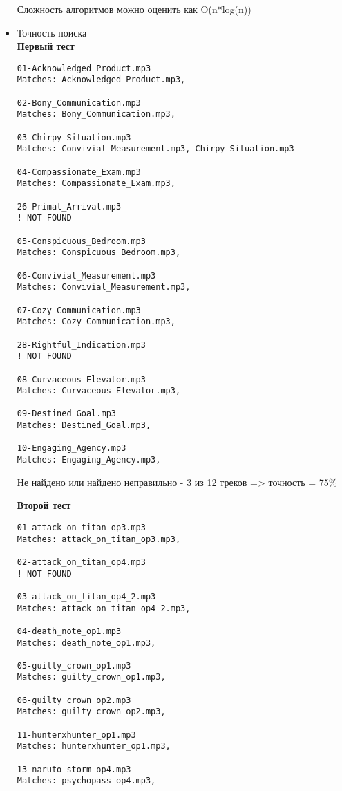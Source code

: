 \documentclass[12pt]{article}
\begin{document}
\begin{itemize}
    Сложность алгоритмов можно оценить как O(n*log(n))
        \item Точность поиска \\ 

        \textbf{Первый тест} \\ 
        
        \begin{lstlisting}
01-Acknowledged_Product.mp3
Matches: Acknowledged_Product.mp3, 

02-Bony_Communication.mp3
Matches: Bony_Communication.mp3, 

03-Chirpy_Situation.mp3
Matches: Convivial_Measurement.mp3, Chirpy_Situation.mp3

04-Compassionate_Exam.mp3
Matches: Compassionate_Exam.mp3, 

26-Primal_Arrival.mp3
! NOT FOUND

05-Conspicuous_Bedroom.mp3
Matches: Conspicuous_Bedroom.mp3, 

06-Convivial_Measurement.mp3
Matches: Convivial_Measurement.mp3, 

07-Cozy_Communication.mp3
Matches: Cozy_Communication.mp3, 

28-Rightful_Indication.mp3
! NOT FOUND

08-Curvaceous_Elevator.mp3
Matches: Curvaceous_Elevator.mp3, 

09-Destined_Goal.mp3
Matches: Destined_Goal.mp3, 

10-Engaging_Agency.mp3
Matches: Engaging_Agency.mp3, 
        \end{lstlisting}
        Не найдено или найдено неправильно  - 3 из 12 треков => точность = 75\%

    \textbf{Второй тест} \\

        \begin{lstlisting}
01-attack_on_titan_op3.mp3
Matches: attack_on_titan_op3.mp3, 

02-attack_on_titan_op4.mp3
! NOT FOUND

03-attack_on_titan_op4_2.mp3
Matches: attack_on_titan_op4_2.mp3, 

04-death_note_op1.mp3
Matches: death_note_op1.mp3, 

05-guilty_crown_op1.mp3
Matches: guilty_crown_op1.mp3, 

06-guilty_crown_op2.mp3
Matches: guilty_crown_op2.mp3, 

11-hunterxhunter_op1.mp3
Matches: hunterxhunter_op1.mp3, 

13-naruto_storm_op4.mp3
Matches: psychopass_op4.mp3, 


\end{lstlisting}
\end{itemize}
\end{document}
